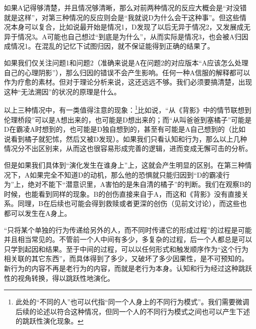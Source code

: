 如果A记得够清楚，并且情况够清晰，那么对前两种情况的反应大概会是“对没错就是这样”，对第三种情况的反应则会是“我就说D为什么会干这种事”。但这些情况本身可以复合，比如说最开始是情况1，D发现了以后无异于情况2，又发展成无异于情况3。A可能也自己想过“到底是为什么”，从而实际是情况3，也会被A归因成情况1。在混乱的记忆下试图归因，就不保证能得到正确的结果了。

如果我们仅关注问题1和问题2（准确来说是A在问题2的对应版本“A应该怎么处理自己的心理阴影”），那么归因的错误不会产生影响。任何一种A信服的解释都可以作为疗愈的素材。但对于理论分析来说，这还远远不够。我们必须要搞清楚，出现这种“无法溯因”的状况的原理是什么。

以上三种情况中，有一类值得注意的现象：\footnote{此处的“不同的人”也可以代指“同一个人身上的不同行为模式”。我们需要微调后续的论述以符合这种情况，但同一个人的不同行为模式之间也可以产生下述的跳跃性演化现象。}比如说，“从《背影》中的情节联想到伦理桥段”可以是A想出来的，也可能是D想出来的；而“从叫爸爸到塞橘子”可能是D在霸凌A时想到的，也可能是D独自想到的，甚至有可能是A自己想到的（比如说看到橘子就犯怵，然后又被D发现）。如果我们只看认知和行为，那么以上几种情况分不出区别来，从而这也很容易形成完善的逻辑，进而变成无懈可击的分析。

但是如果我们具体到“演化发生在谁身上”上，这就会产生明显的区别。在第三种情况下，A如果完全不知道D的动机，那么他的恐惧就只能归因到“D的霸凌行为”上，绝对不能下“潜意识里，A害怕的是朱自清的橘子”的判断。我们在观察B的时候，也能看到同样的现象。B的创伤直接来自于A，而这和《背影》没有直接关系。同理，B在后续也可能会得到救赎或者更深的创伤（见前文讨论），而这些也都可以发生在A身上。

“只将某个单独的行为传递给另外的人，而不同时传递它的形成过程”的过程是可能并且相当常见的。不管前一个人中间有多少，多复杂的过程，后一个人都总是可以只学到起因和结果。至于中间的过程，可以以任何形式和触发顺序作为“这个行为相关联的其它东西”，而具体得到了多少，又破坏了多少因果性，是不可预知的。新行为的内容不再是老行为的内容，而就是老行为本身。认知和行为经过这种跳跃性的视角转换，得以跳跃性地演化。

